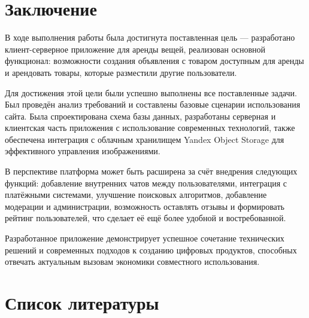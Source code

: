 \documentclass[14pt]{extarticle}
\begin{document}
\newpage


\section{Заключение}

В ходе выполнения работы была достигнута поставленная цель ---
разработано клиент-серверное приложение для аренды вещей,
реализован основной функционал: возможности создания объявления с товаром
доступным для аренды и арендовать товары, которые разместили другие пользователи.

Для достижения этой цели были успешно выполнены все поставленные задачи.
Был проведён анализ требований и составлены базовые сценарии использования сайта.
Была спроектирована схема базы данных, разработаны серверная и клиентская часть приложения
с использование современных технологий, также обеспечена интеграция с облачным хранилищем
Yandex Object Storage для эффективного управления изображениями.

В перспективе платформа может быть расширена за счёт внедрения следующих функций:
добавление внутренних чатов между пользователями, интеграция с платёжными системами,
улучшение поисковых алгоритмов, добавление модерации и администрации,
возможность оставлять отзывы и формировать рейтинг пользователей,
что сделает её ещё более удобной и востребованной.

Разработанное приложение демонстрирует успешное сочетание технических решений
и современных подходов к созданию цифровых продуктов,
способных отвечать актуальным вызовам экономики совместного использования.

\newpage


\section{Список литературы}

\bigskip
\end{document}
